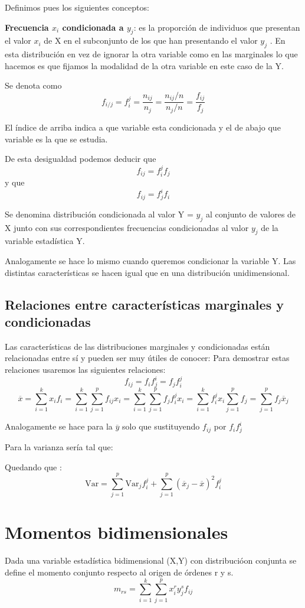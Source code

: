 \documentclass{article}
\begin{document}
	Definimos pues los siguientes conceptos:
	
	\textbf{Frecuencia $x_i$ condicionada a $y_j$}: es la proporción de individuos que presentan el valor $x_i$ de X en el subconjunto de los que han presentando el valor $y_j$ . En esta distribución en vez de ignorar la otra variable como en las marginales lo que hacemos es que fijamos la modalidad de la otra variable en este caso de la Y.
	
	Se denota como $$ f_{i/j} = f_i^j = \frac{n_{ij} } {n_j} = \frac{n_{ij}/n}{n_j/n} = \frac{f_{ij}}{f_j} $$
	
	El índice de arriba indica a que variable esta condicionada y el de abajo que variable es la que se estudia.	
	
	De esta desigualdad podemos deducir que $$ f_{ij} = f_i^j f_j $$
	y que  $$ f_{ij} = f_j^i f_i $$
	
	Se denomina distribución condicionada al valor Y = $y_j$ al conjunto de valores de X junto con sus correspondientes frecuencias condicionadas al valor $y_j$ de la variable estadística Y.
	
	Analogamente se hace lo mismo cuando queremos condicionar la variable Y.
	Las distintas características se hacen igual que en una distribución unidimensional.
	
\subsection{Relaciones entre características marginales y condicionadas}

	Las características de las distribuciones marginales y condicionadas están relacionadas entre sí y pueden ser muy útiles de conocer:
	Para demostrar estas relaciones usaremos las siguientes relaciones: $$f_{ij} = f_i f_j^i = f_j f_i^j $$
	$$ \overline{x} = \sum_{i=1}^k x_i f_i =\sum_{i=1}^{k} \sum_{j=1}^{p} f_{ij} x_i = \sum_{i=1}^{k} \sum_{j=1}^{p} f_j f_i^j x_i =  \sum_{i=1}^{k} f_i^j x_i \sum_{j=1}^{p} f_j   = \sum_{j=1}^p f_j \overline{x}_j  $$
	
	Analogamente se hace para la $\overline{y}$ solo que sustituyendo $f_{ij}$ por 
$f_i f_j^i$
	
	Para la varianza sería tal que:
\vspace{8cm}


	Quedando que : $$ \mathrm{Var} = \sum_{j = 1} ^p \mathrm{Var}_j   f_i^j + \sum_{j = 1} ^p ( \overline{x}_j - \overline{x})^2 f_i^j $$
	
\section{Momentos bidimensionales}
	Dada una variable estadística bidimensional (X,Y) con distribucióon conjunta se define el momento conjunto respecto al origen de órdenes r y s.
	$$ m_{rs} = \sum_{i=1}^k \sum_{j=1}^p x_i^r y_j^s f_{ij}$$
	
\end{document}
